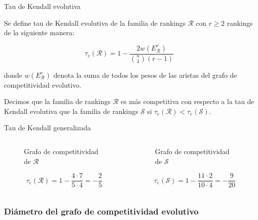 \documentclass[10pt]{beamer}
\begin{document}
	\begin{frame}{Tau de Kendall evolutiva}
		\begin{defi}
			Se define tau de Kendall evolutiva de la familia de rankings $\mathcal{R}$ con $r \geq 2$ rankings de la siguiente manera:
			
			\begin{equation}
			\tau_e(\mathcal{R}) = 1 - \dfrac{2 w(E_\mathcal{R}^e)}{\binom{n}{2}(r-1)}
			\end{equation} 
			
			donde $w(E_\mathcal{R}^e)$ denota la suma de todos los pesos de las aristas del grafo de competitividad evolutivo.
		\end{defi}
		
		\begin{defi}
			Decimos que la familia de rankings $\mathcal{R}$ es más competitiva con respecto a la tau de Kendall evolutiva que la familia de rankings $\mathcal{S}$ si $\tau_e(\mathcal{R}) < \tau_e(\mathcal{S})$.
		\end{defi}
	\end{frame}
	
	\begin{frame}{Tau de Kendall generalizada}
		\begin{ejemplo}
			\begin{columns}[t] %
				\begin{column}{.50\textwidth}
					\begin{figure}
						\centering
						\resizebox{!}{0.3\textheight}{\ejemplografocompetitividadevolutivo}
						\caption{Grafo de competitividad de $\mathcal{R}$}
					\end{figure}
					\[ \tau_e(\mathcal{R}) = 1 - \dfrac{4 \cdot 7}{5 \cdot 4} = -\dfrac{2}{5} \]
				\end{column}%
				\hfill%
				\begin{column}{.50\textwidth}
					\begin{figure}
						\centering
						\resizebox{!}{0.3\textheight}{\ejemplofuerzamedia}
						\caption{Grafo de competitividad de $\mathcal{S}$}
					\end{figure}
					\[ \tau_e(\mathcal{S}) = 1 - \dfrac{11 \cdot 2}{10 \cdot 4} = -\dfrac{9}{20} \]
				\end{column}%
			\end{columns}
		\end{ejemplo}
	\end{frame}
	
	\subsubsection{Diámetro del grafo de competitividad evolutivo}
	
\end{document}
